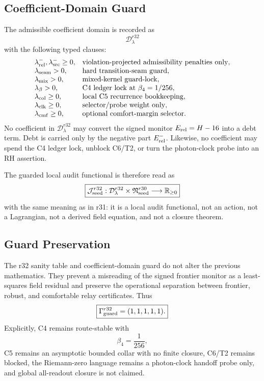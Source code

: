 \subsection{Coefficient-Domain Guard}
\label{subsec:r32-coefficient-domain-guard}

The admissible coefficient domain is recorded as
\[
\boxed{
\mathcal D_{\lambda}^{r32}
}
\]
with the following typed clauses:
\[
\begin{array}{ll}
\lambda_{\rm rel}^{-},\lambda_{\rm src}^{-}\geq0,&
\text{violation-projected admissibility penalties only},\\
\lambda_{\rm seam}>0,&
\text{hard transition-seam guard},\\
\lambda_{\rm mix}>0,&
\text{mixed-kernel guard-lock},\\
\lambda_{\beta}>0,&
\text{C4 ledger lock at }\beta_4=1/256,\\
\lambda_{\rm col}\geq0,&
\text{local C5 recurrence bookkeeping},\\
\lambda_{\rm clk}\geq0,&
\text{selector/probe weight only},\\
\lambda_{\rm cmf}\geq0,&
\text{optional comfort-margin selector}.
\end{array}
\]
No coefficient in \(\mathcal D_{\lambda}^{r32}\) may convert the signed monitor
\(E_{\rm rel}=H-16\) into a debt term.  Debt is carried only by the negative
part \(E_{\rm rel}^{-}\).  Likewise, no coefficient may spend the C4 ledger
lock, unblock C6/T2, or turn the photon-clock probe into an RH assertion.

The guarded local audit functional is therefore read as
\[
\boxed{
\mathcal J_{\rm seed}^{r32}
:
\mathcal D_{\lambda}^{r32}
\times
\mathfrak N_{\rm seed}^{r30}
\longrightarrow
\mathbb R_{\geq0}
}
\]
with the same meaning as in r31: it is a local audit functional, not an action,
not a Lagrangian, not a derived field equation, and not a closure theorem.

\subsection{Guard Preservation}
\label{subsec:r32-guard-preservation}

The r32 sanity table and coefficient-domain guard do not alter the previous
mathematics.  They prevent a misreading of the signed frontier monitor as a
least-squares field residual and preserve the operational separation between
frontier, robust, and comfortable relay certificates.  Thus
\[
\boxed{
\Gamma_{\rm guard}^{r32}=(1,1,1,1,1).
}
\]
Explicitly, C4 remains route-stable with
\[
\beta_4=\frac1{256},
\]
C5 remains an asymptotic bounded collar with no finite closure, C6/T2 remains
blocked, the Riemann-zero language remains a photon-clock handoff probe only,
and global all-readout closure is not claimed.


